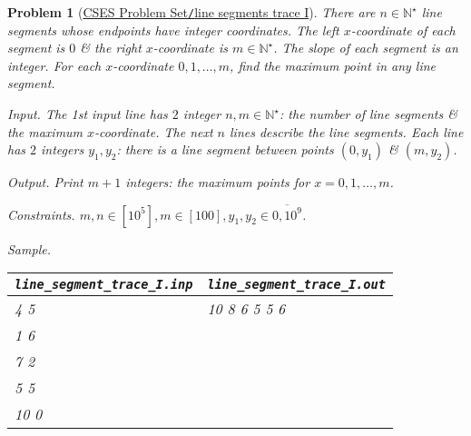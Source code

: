 \documentclass{article}
\newtheorem{problem}{Problem}
\begin{document}
\begin{problem}[\href{https://cses.fi/problemset/task/3427}{CSES Problem Set{\tt/}line segments trace I}]
    There are $n\in\mathbb{N}^\star$ line segments whose endpoints have integer coordinates. The left $x$-coordinate of each segment is $0$ \& the right $x$-coordinate is $m\in\mathbb{N}^\star$. The slope of each segment is an integer. For each $x$-coordinate $0,1,\ldots,m$, find the maximum point in any line segment.
    \item {\sf Input.} The 1st input line has $2$ integer $n,m\in\mathbb{N}^\star$: the number of line segments \& the maximum $x$-coordinate. The next $n$ lines describe the line segments. Each line has $2$ integers $y_1,y_2$: there is a line segment between points $(0,y_1)$ \& $(m,y_2)$.
    \item {\sf Output.} Print $m + 1$ integers: the maximum points for $x = 0,1,\ldots,m$.
    \item {\sf Constraints.} $m,n\in[10^5],m\in[100],y_1,y_2\in\overline{0,10^9}$.
    \item {\sf Sample.}
    \begin{table}[H]
        \centering
        \begin{tabular}{|l|l|}
            \hline
            \verb|line_segment_trace_I.inp| & \verb|line_segment_trace_I.out| \\
            \hline
            4 5 & 10 8 6 5 5 6 \\
            1 6 & \\
            7 2 & \\
            5 5 & \\
            10 0 & \\
            \hline
        \end{tabular}
    \end{table}
\end{problem}
\end{document}
